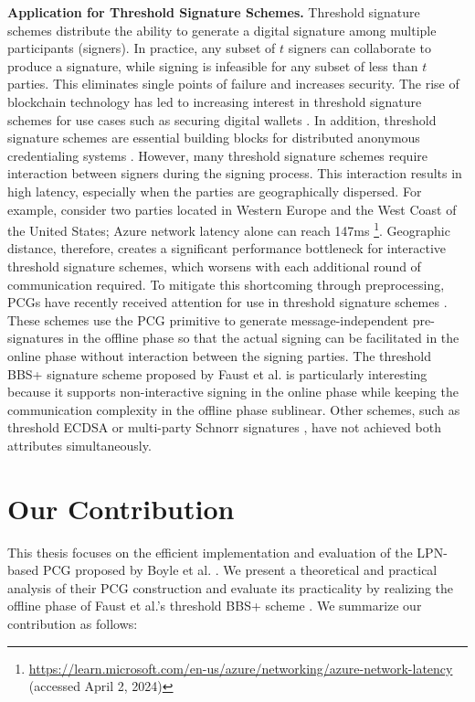 \textbf{Application for Threshold Signature Schemes.}  Threshold signature schemes \cite{desmedt1987society, desmedt1992threshold} distribute the ability to generate a digital signature among multiple participants (signers). In practice, any subset of $t$ signers can collaborate to produce a signature, while signing is infeasible for any subset of less than $t$ parties. This eliminates single points of failure and increases security. The rise of blockchain technology has led to increasing interest in threshold signature schemes for use cases such as securing digital wallets \cite{gennaro2016threshold}. In addition, threshold signature schemes are essential building blocks for distributed anonymous credentialing systems \cite{garman2013decentralized}. However, many threshold signature schemes require interaction between signers during the signing process. This interaction results in high latency, especially when the parties are geographically dispersed. For example, consider two parties located in Western Europe and the West Coast of the United States; Azure network latency alone can reach 147ms \footnote{\url{https://learn.microsoft.com/en-us/azure/networking/azure-network-latency} (accessed April 2, 2024)}. Geographic distance, therefore, creates a significant performance bottleneck for interactive threshold signature schemes, which worsens with each additional round of communication required. To mitigate this shortcoming through preprocessing, PCGs have recently received attention for use in threshold signature schemes \cite{abram2022low, faust2023non}. These schemes use the PCG primitive to generate message-independent pre-signatures in the offline phase so that the actual signing can be facilitated in the online phase without interaction between the signing parties. The threshold BBS+ signature scheme proposed by Faust et al. \cite{faust2023non} is particularly interesting because it supports non-interactive signing in the online phase while keeping the communication complexity in the offline phase sublinear. Other schemes, such as threshold ECDSA \cite{abram2022low} or multi-party Schnorr signatures \cite{kondi2023two}, have not achieved both attributes simultaneously. 

\section{Our Contribution}
This thesis focuses on the efficient implementation and evaluation of the LPN-based PCG proposed by Boyle et al. \cite{boyle2020efficient}. We present a theoretical and practical analysis of their PCG construction and evaluate its practicality by realizing the offline phase of Faust et al.'s threshold BBS+ scheme \cite{faust2023non}. We summarize our contribution as follows:

